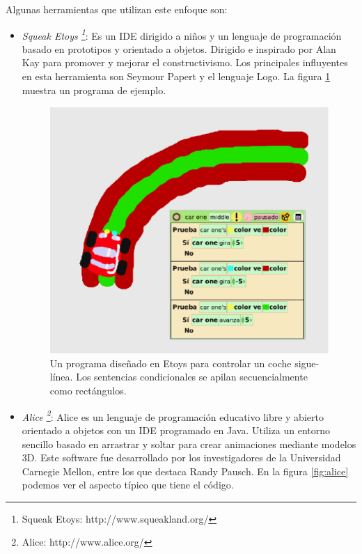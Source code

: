 \documentclass{llncs}
\begin{document}
Algunas herramientas que utilizan este enfoque son:
\begin{itemize}
\item {\em Squeak Etoys \footnote{Squeak Etoys: http://www.squeakland.org/}}: Es un IDE dirigido a niños y un lenguaje de programación basado en prototipos y orientado a objetos. Dirigido e inspirado por Alan Kay para promover y mejorar el constructivismo. Los principales influyentes en esta herramienta son Seymour Papert y el lenguaje Logo. La figura \ref{fig:etoys} muestra un programa de ejemplo.


\begin{figure}[ht]
\begin{center}
\includegraphics[scale=0.4]{images/etoys.eps}
\caption{Un programa diseñado en Etoys para controlar un coche sigue-línea. Los sentencias condicionales se apilan secuencialmente como rectángulos.
\label{fig:etoys}}
\end{center}
\end{figure}

\item {\em Alice \footnote{Alice: http://www.alice.org/}}: Alice es un lenguaje de programación educativo libre y abierto orientado a objetos con un IDE programado en Java. Utiliza un entorno sencillo basado en arrastrar y soltar para crear animaciones mediante modelos 3D. Este software fue desarrollado por los investigadores de la Universidad Carnegie Mellon, entre los que destaca Randy Pausch. En la figura \ref{fig:alice} podemos ver el aspecto típico que tiene el código.


\end{itemize}
\end{document}
